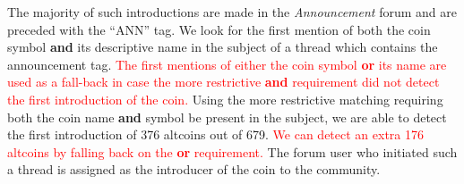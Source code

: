 The  majority of such introductions are made in the \textit{Announcement} forum and are preceded with the ``ANN'' tag. We look for the first mention of both the coin symbol \textbf{and} its descriptive name in the subject of a thread which contains the announcement tag. \textcolor{red}{The first mentions of either the coin symbol \textbf{or} its name are used as a fall-back in case the more restrictive \textbf{and} requirement did not detect the first introduction of the coin.}
Using the more restrictive matching requiring both the coin name \textbf{and} symbol be present in the subject, we are able to detect the first introduction of 376 altcoins out of 679. \textcolor{red}{We can detect an extra 176 altcoins by falling back on the \textbf{or} requirement.}
The forum user who initiated such a thread is assigned as the introducer of the coin to the community.

